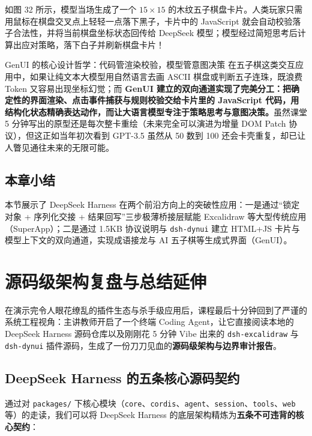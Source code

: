 \documentclass[a4paper]{article}
\begin{document}
如图 32 所示，模型当场生成了一个 $15 \times 15$ 的木纹五子棋盘卡片。人类玩家只需用鼠标在棋盘交叉点上轻轻一点落下黑子，卡片中的 JavaScript 就会自动校验落子合法性，并将当前棋盘坐标状态回传给 DeepSeek 模型；模型经过简短思考后计算出应对策略，落下白子并刷新棋盘卡片！
\begin{importantbox}{GenUI 的核心设计哲学：代码管渲染校验，模型管意图决策}
在五子棋这类交互应用中，如果让纯文本大模型用自然语言去画 ASCII 棋盘或判断五子连珠，既浪费 Token 又容易出现坐标幻觉；而 \textbf{GenUI 建立的双向通道实现了完美分工：把确定性的界面渲染、点击事件捕获与规则校验交给卡片里的 JavaScript 代码，用结构化状态精确表达动作，而让大语言模型专注于策略思考与意图决策。}虽然课堂 5 分钟写出的原型还是每次整卡重绘（未来完全可以演进为增量 DOM Patch 协议），但这正如当年初次看到 GPT-3.5 虽然从 50 数到 100 还会卡壳重复，却已让人瞥见通往未来的无限可能。
\end{importantbox}

\subsection{本章小结}

本节展示了 DeepSeek Harness 在两个前沿方向上的突破性应用：一是通过“锁定对象 + 序列化交接 + 结果回写”三步极薄桥接层赋能 Excalidraw 等大型传统应用（SuperApp）；二是通过 1.5KB 协议说明与 \texttt{dsh-dynui} 建立 HTML+JS 卡片与模型上下文的双向通道，实现成语接龙与 AI 五子棋等生成式界面（GenUI）。

\section{源码级架构复盘与总结延伸}\label{sec:contracts}

在演示完令人眼花缭乱的插件生态与杀手级应用后，课程最后十分钟回到了严谨的系统工程视角：主讲教师开启了一个终端 Coding Agent，让它直接阅读本地的 DeepSeek Harness 源码仓库以及刚刚花 5 分钟 Vibe 出来的 \texttt{dsh-excalidraw} 与 \texttt{dsh-dynui} 插件源码，生成了一份刀刀见血的\textbf{源码级架构与边界审计报告}。

\subsection{DeepSeek Harness 的五条核心源码契约}

通过对 \texttt{packages/} 下核心模块（\texttt{core}、\texttt{cordis}、\texttt{agent}、\texttt{session}、\texttt{tools}、\texttt{web} 等）的走读，我们可以将 DeepSeek Harness 的底层架构精炼为\textbf{五条不可违背的核心契约}：
\end{document}
